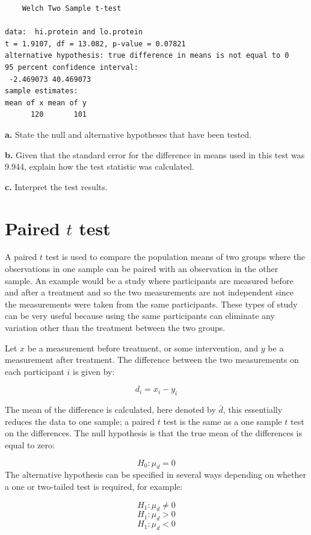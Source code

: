 \documentclass[
  oneside]{krantz}
\begin{document}
\begin{verbatim}
    Welch Two Sample t-test

data:  hi.protein and lo.protein
t = 1.9107, df = 13.082, p-value = 0.07821
alternative hypothesis: true difference in means is not equal to 0
95 percent confidence interval:
 -2.469073 40.469073
sample estimates:
mean of x mean of y 
      120       101 
\end{verbatim}

\textbf{a.} State the null and alternative hypotheses that have been tested.

\textbf{b.} Given that the standard error for the difference in means used in this test was 9.944, explain how the test statistic was calculated.

\textbf{c.} Interpret the test results.

\hypertarget{paired-t-test}{%
\section{\texorpdfstring{Paired \(t\) test}{Paired t test}}\label{paired-t-test}}

A paired \(t\) test is used to compare the population means of two groups where the observations in one sample can be paired with an observation in the other sample. An example would be a study where participants are measured before and after a treatment and so the two measurements are not independent since the measurements were taken from the same participants. These types of study can be very useful because using the same participants can eliminate any variation other than the treatment between the two groups.

Let \(x\) be a measurement before treatment, or some intervention, and \(y\) be a measurement after treatment. The difference between the two measurements on each participant \(i\) is given by:

\[d_i = x_i - y_i\]

The mean of the difference is calculated, here denoted by \(\bar d\), this essentially reduces the data to one sample; a paired \(t\) test is the same as a one sample \(t\) test on the differences. The null hypothesis is that the true mean of the differences is equal to zero:

\[H_0: \mu_d = 0\]
The alternative hypothesis can be specified in several ways depending on whether a one or two-tailed test is required, for example:

\[H_1: \mu_d \ne 0\]
\[H_1: \mu_d > 0\]
\[H_1: \mu_d < 0\]
\end{document}
